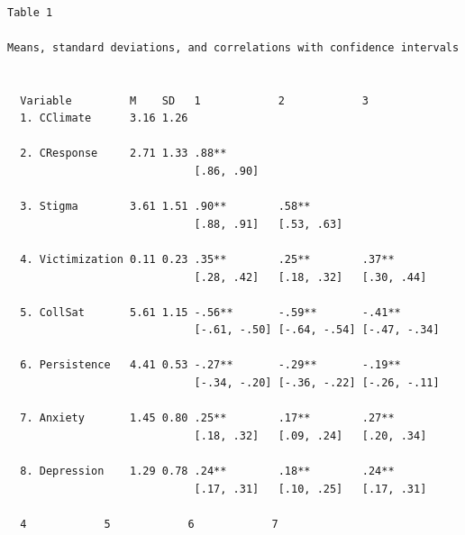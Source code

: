 \documentclass[
  english,
]{book}
\begin{document}
\begin{verbatim}

Table 1 

Means, standard deviations, and correlations with confidence intervals
 

  Variable         M    SD   1            2            3           
  1. CClimate      3.16 1.26                                       
                                                                   
  2. CResponse     2.71 1.33 .88**                                 
                             [.86, .90]                            
                                                                   
  3. Stigma        3.61 1.51 .90**        .58**                    
                             [.88, .91]   [.53, .63]               
                                                                   
  4. Victimization 0.11 0.23 .35**        .25**        .37**       
                             [.28, .42]   [.18, .32]   [.30, .44]  
                                                                   
  5. CollSat       5.61 1.15 -.56**       -.59**       -.41**      
                             [-.61, -.50] [-.64, -.54] [-.47, -.34]
                                                                   
  6. Persistence   4.41 0.53 -.27**       -.29**       -.19**      
                             [-.34, -.20] [-.36, -.22] [-.26, -.11]
                                                                   
  7. Anxiety       1.45 0.80 .25**        .17**        .27**       
                             [.18, .32]   [.09, .24]   [.20, .34]  
                                                                   
  8. Depression    1.29 0.78 .24**        .18**        .24**       
                             [.17, .31]   [.10, .25]   [.17, .31]  
                                                                   
  4            5            6            7         
                                                   
                                                   
                                                   
                                                   
                                                   

\end{verbatim}
\end{document}
